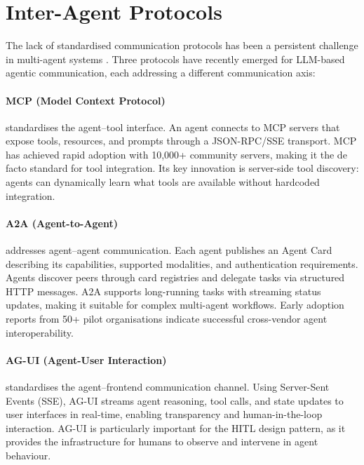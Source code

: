 \documentclass[review,authoryear]{elsarticle}
\theoremstyle{definition}
\begin{document}
\section{Inter-Agent Protocols}\label{sec:protocols}

The lack of standardised communication protocols has been a persistent challenge in multi-agent systems \citep{fipa2002acl,singh2005overview}. Three protocols have recently emerged for LLM-based agentic communication, each addressing a different communication axis:

\paragraph{MCP (Model Context Protocol)} \citep{anthropic2024mcp} standardises the agent--tool interface. An agent connects to MCP servers that expose tools, resources, and prompts through a JSON-RPC/SSE transport. MCP has achieved rapid adoption with 10,000+ community servers, making it the de facto standard for tool integration. Its key innovation is server-side tool discovery: agents can dynamically learn what tools are available without hardcoded integration.

\paragraph{A2A (Agent-to-Agent)} \citep{google2024a2a} addresses agent--agent communication. Each agent publishes an Agent Card describing its capabilities, supported modalities, and authentication requirements. Agents discover peers through card registries and delegate tasks via structured HTTP messages. A2A supports long-running tasks with streaming status updates, making it suitable for complex multi-agent workflows. Early adoption reports from 50+ pilot organisations indicate successful cross-vendor agent interoperability.

\paragraph{AG-UI (Agent-User Interaction)} \citep{copilotkit2024agui} standardises the agent--frontend communication channel. Using Server-Sent Events (SSE), AG-UI streams agent reasoning, tool calls, and state updates to user interfaces in real-time, enabling transparency and human-in-the-loop interaction. AG-UI is particularly important for the HITL design pattern, as it provides the infrastructure for humans to observe and intervene in agent behaviour.
\end{document}
